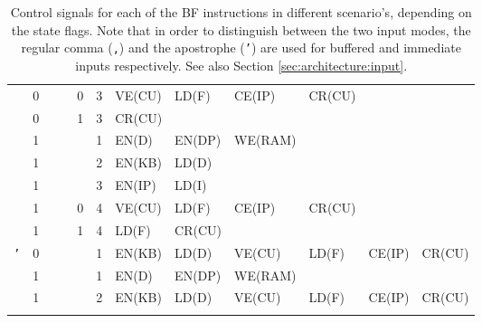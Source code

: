 \begin{landscape}
\begin{longtable}[c] {c|cccc|c|llllll}
    \rowcolor{Gray}
               & 0 &   &       & 0    & 3     & VE(CU)  & LD(F)   & CE(IP) & CR(CU) &        &        \\
    \rowcolor{White}
               & 0 &   &       & 1    & 3     & CR(CU)  &         &        &        &        &        \\   
    \rowcolor{Gray}
               & 1 &   &       &      & 1     & EN(D)   & EN(DP)  & WE(RAM)&        &        &        \\       
    \rowcolor{Gray}
               & 1 &   &       &      & 2     & EN(KB)  & LD(D)   &        &        &        &        \\
    \rowcolor{Gray}
               & 1 &   &       &      & 3     & EN(IP)  & LD(I)   &        &        &        &        \\
    \rowcolor{Gray}
               & 1 &   &       & 0    & 4     & VE(CU)  & LD(F)   & CE(IP) & CR(CU) &        &        \\
    \rowcolor{White}
               & 1 &   &       & 1    & 4     & LD(F)   & CR(CU)  &        &        &        &        \\ \hline
    \rowcolor{Gray}
    \texttt{'} & 0 &   &       &      & 1     & EN(KB)  & LD(D)   & VE(CU) & LD(F)  & CE(IP) & CR(CU) \\
    \rowcolor{White}
               & 1 &   &       &      & 1     & EN(D)   & EN(DP)  & WE(RAM)&        &        &        \\
    \rowcolor{White}
               & 1 &   &       &      & 2     & EN(KB)  & LD(D)   & VE(CU) & LD(F)  & CE(IP) & CR(CU) \\ \hline


      

  \caption{Control signals for each of the BF instructions in different scenario's, depending on the state flags. Note that in order to distinguish between the two input modes, the regular comma (\texttt{,}) and the apostrophe (\texttt{'}) are used for buffered and immediate inputs respectively. See also Section \ref{sec:architecture:input}.}
  \label{tab:microcode}
\end{longtable}

\end{landscape}
